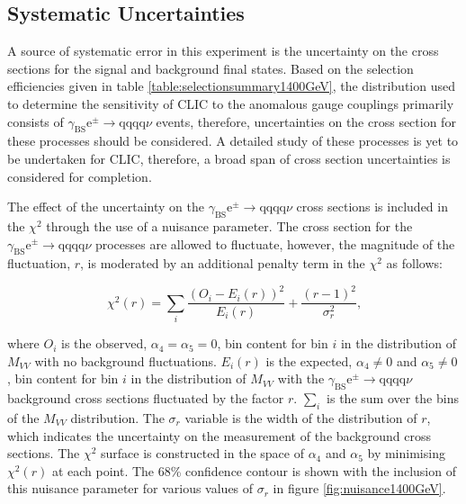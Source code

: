 
\subsection{Systematic Uncertainties}
A source of systematic error in this experiment is the uncertainty on the cross sections for the signal and background final states.  Based on the selection efficiencies given in table \ref{table:selectionsummary1400GeV}, the distribution used to determine the sensitivity of CLIC to the anomalous gauge couplings primarily consists of $\gamma_{\text{BS}}\text{e}^{\pm} \rightarrow \text{qqqq}\nu$ events, therefore, uncertainties on the cross section for these processes should be considered.  A detailed study of these processes is yet to be undertaken for CLIC, therefore, a broad span of cross section uncertainties is considered for completion.

The effect of the uncertainty on the $\gamma_{\text{BS}}\text{e}^{\pm} \rightarrow \text{qqqq}\nu$ cross sections is included in the $\chi^{2}$ through the use of a nuisance parameter.  The cross section for the $\gamma_{\text{BS}}\text{e}^{\pm} \rightarrow \text{qqqq}\nu$ processes are allowed to fluctuate, however, the magnitude of the fluctuation, $r$, is moderated by an additional penalty term in the $\chi^{2}$ as follows:

\begin{equation}
\chi^{2}(r) = \sum_{i} \frac{(O_{i} - E_{i}(r))^{2}}{E_{i}(r)} + \frac{(r-1)^{2}}{\sigma_{r}^{2}} \text{,}
\end{equation}

\noindent where $O_{i}$ is the observed, $\alpha_{4} = \alpha_{5} = 0$, bin content for bin $i$ in the distribution of $M_{VV}$ with no background fluctuations.  $E_{i}(r)$ is the expected, $\alpha_{4} \neq 0$ and $\alpha_{5} \neq 0$, bin content for bin $i$ in the distribution of $M_{VV}$ with the $\gamma_{\text{BS}}\text{e}^{\pm} \rightarrow \text{qqqq}\nu$ background cross sections fluctuated by the factor $r$.  $\sum_{i}$ is the sum over the bins of the $M_{VV}$ distribution.  The $\sigma_{r}$ variable is the width of the distribution of $r$, which indicates the uncertainty on the measurement of the background cross sections.  The $\chi^{2}$ surface is constructed in the space of $\alpha_{4}$ and $\alpha_{5}$ by minimising $\chi^{2}(r)$ at each point.  The 68\% confidence contour is shown with the inclusion of this nuisance parameter for various values of $\sigma_{r}$ in figure \ref{fig:nuisance1400GeV}.   

